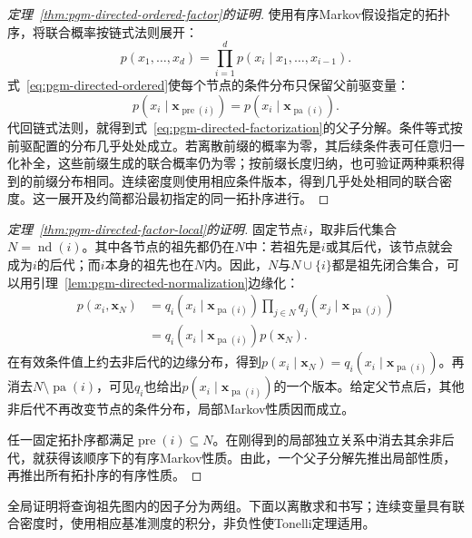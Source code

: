 \begin{proof}[定理~\ref{thm:pgm-directed-ordered-factor}的证明]
使用有序Markov假设指定的拓扑序，将联合概率按链式法则展开：
\[
  p(x_1,\ldots,x_d)=
  \prod_{i=1}^{d}p(x_i\mid x_1,\ldots,x_{i-1}).
\]
式~\eqref{eq:pgm-directed-ordered}使每个节点的条件分布只保留父前驱变量：
\[
  p(x_i\mid\bm{x}_{\operatorname{pre}(i)})
    =p(x_i\mid\bm{x}_{\operatorname{pa}(i)}).
\]
代回链式法则，就得到式~\eqref{eq:pgm-directed-factorization}的父子分解。条件等式按前驱配置的分布几乎处处成立。若离散前缀的概率为零，其后续条件表可任意归一化补全，这些前缀生成的联合概率仍为零；按前缀长度归纳，也可验证两种乘积得到的前缀分布相同。连续密度则使用相应条件版本，得到几乎处处相同的联合密度。这一展开及约简都沿最初指定的同一拓扑序进行。
\end{proof}

\begin{proof}[定理~\ref{thm:pgm-directed-factor-local}的证明]
固定节点$i$，取非后代集合$N=\operatorname{nd}(i)$。其中各节点的祖先都仍在$N$中：若祖先是$i$或其后代，该节点就会成为$i$的后代；而$i$本身的祖先也在$N$内。因此，$N$与$N\cup\{i\}$都是祖先闭合集合，可以用引理~\ref{lem:pgm-directed-normalization}边缘化：
\[
  \begin{aligned}
    p(x_i,\bm{x}_N)
      &=q_i(x_i\mid\bm{x}_{\operatorname{pa}(i)})
        \prod_{j\in N}q_j(x_j\mid\bm{x}_{\operatorname{pa}(j)})\\
      &=q_i(x_i\mid\bm{x}_{\operatorname{pa}(i)})p(\bm{x}_N).
  \end{aligned}
\]
在有效条件值上约去非后代的边缘分布，得到$p(x_i\mid\bm{x}_N)=q_i(x_i\mid\bm{x}_{\operatorname{pa}(i)})$。再消去$N\setminus\operatorname{pa}(i)$，可见$q_i$也给出$p(x_i\mid\bm{x}_{\operatorname{pa}(i)})$的一个版本。给定父节点后，其他非后代不再改变节点的条件分布，局部Markov性质因而成立。

任一固定拓扑序都满足$\operatorname{pre}(i)\subseteq N$。在刚得到的局部独立关系中消去其余非后代，就获得该顺序下的有序Markov性质。由此，一个父子分解先推出局部性质，再推出所有拓扑序的有序性质。
\end{proof}

全局证明将查询祖先图内的因子分为两组。下面以离散求和书写；连续变量具有联合密度时，使用相应基准测度的积分，非负性使Tonelli定理适用。

